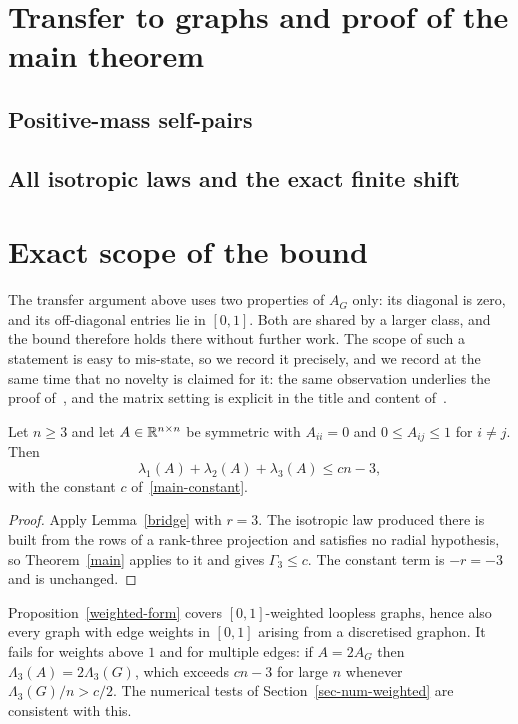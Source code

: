 \section{Transfer to graphs and proof of the main theorem}\label{sec-conclusion}


\subsection{Positive-mass self-pairs}


\subsection{All isotropic laws and the exact finite shift}


\section{Exact scope of the bound}\label{sec-weighted}

The transfer argument above uses two properties of $A_G$ only: its diagonal is
zero, and its off-diagonal entries lie in $[0,1]$. Both are shared by a larger
class, and the bound therefore holds there without further work. The scope of such a statement is easy to mis-state, so we record it
precisely, and we record at the same time that no novelty is claimed for it:
the same observation underlies the proof of~\cite[Proposition 6.1]{STW}, and
the matrix setting is explicit in the title and content of~\cite{Mohar}.

\begin{proposition}\label{weighted-form}
Let $n\ge3$ and let $A\in\mathbb R^{n\times n}$ be symmetric with $A_{ii}=0$ and
$0\le A_{ij}\le1$ for $i\ne j$. Then
\[
 \lambda_1(A)+\lambda_2(A)+\lambda_3(A)\le cn-3,
\]
with the constant $c$ of~\eqref{main-constant}.
\end{proposition}
\begin{proof}
Apply Lemma~\ref{bridge} with $r=3$. The isotropic law produced there is
built from the rows of a rank-three projection and satisfies no radial
hypothesis, so Theorem~\ref{main} applies to it and gives $\Gamma_3\le c$.
The constant term is $-r=-3$ and is unchanged.
\end{proof}
\begin{remark}\label{weighted-scope}
Proposition~\ref{weighted-form} covers $[0,1]$-weighted loopless graphs, hence
also every graph with edge weights in $[0,1]$ arising from a discretised
graphon. It fails for weights above $1$ and for multiple edges: if $A=2A_G$
then $\Lambda_3(A)=2\Lambda_3(G)$, which exceeds $cn-3$ for large $n$
whenever $\Lambda_3(G)/n> c/2$. The numerical tests of
Section~\ref{sec-num-weighted} are consistent with this.
\end{remark}

